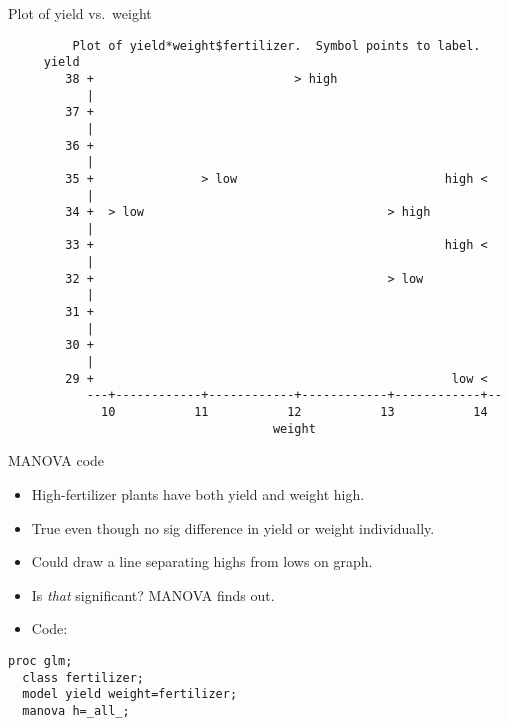 \documentclass[pdf]{prosper}
\begin{document}
\begin{slide}{Plot of yield vs.\ weight}

{\scriptsize
\begin{verbatim}
         Plot of yield*weight$fertilizer.  Symbol points to label.
     yield
        38 +                            > high
           |
        37 +
           |
        36 +
           |
        35 +               > low                             high <
           |
        34 +  > low                                  > high
           |
        33 +                                                 high <
           |
        32 +                                         > low
           |
        31 +
           |
        30 +
           |
        29 +                                                  low <
           ---+------------+------------+------------+------------+--
             10           11           12           13           14
                                     weight

\end{verbatim}
}
  
\end{slide}

\begin{slide}{MANOVA code}
  \begin{itemize}
  \item High-fertilizer plants have both yield and weight high.
  \item True even though no sig difference in yield or weight individually.
  \item Could draw a line separating highs from lows on graph.
  \item Is {\em that} significant? MANOVA finds out.
  \item Code:
  \end{itemize}

\begin{verbatim}
proc glm;
  class fertilizer;
  model yield weight=fertilizer;
  manova h=_all_;

\end{verbatim}

\end{slide}
\end{document}
